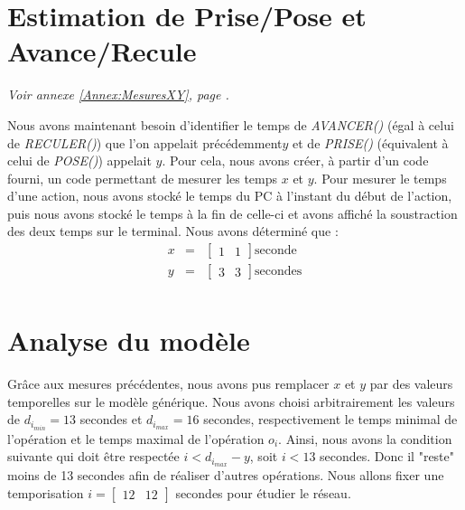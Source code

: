 \section{Estimation de Prise/Pose et Avance/Recule}\label{sec:estimationTemps}
\begin{center}
\textit{Voir annexe \ref{Annex:MesuresXY}, page \pageref{Annex:MesuresXY}.}
\end{center}
Nous avons maintenant besoin d'identifier le temps de \emph{AVANCER()} (égal à celui de \emph{RECULER()}) que l'on appelait précédemment$y$  et de \emph{PRISE()} (équivalent à celui de \emph{POSE()}) appelait $y$. Pour cela, nous avons créer, à partir d'un code fourni, un code permettant de mesurer les temps $x$ et $y$. Pour mesurer le temps d'une action, nous avons stocké le temps du PC à l'instant du début de l'action, puis nous avons stocké le temps à la fin de celle-ci et avons affiché la soustraction des deux temps sur le terminal. 
Nous avons déterminé que :
\begin{eqnarray}
x &=& \begin{bmatrix}
1 & 1
\end{bmatrix} \text{seconde}\\
y &=& \begin{bmatrix}
3 & 3
\end{bmatrix} \text{secondes}\\
\end{eqnarray}
\section{Analyse du modèle}
Grâce aux mesures précédentes, nous avons pus remplacer $x$ et $y$ par des valeurs temporelles sur le modèle générique. Nous avons choisi arbitrairement les valeurs de $d_{i_{min}} = 13$ secondes et $d_{i_{max}} = 16$ secondes, respectivement le temps minimal de l'opération et le temps maximal de l'opération $o_i$.  Ainsi, nous avons la condition suivante qui doit être respectée $i <d_{i_{max}}-y$, soit $i < 13$ secondes. Donc il "reste" moins de 13 secondes afin de réaliser d'autres opérations. Nous allons fixer une temporisation  $i=\begin{bmatrix}
12& 12
\end{bmatrix}$ secondes pour étudier le réseau. 


